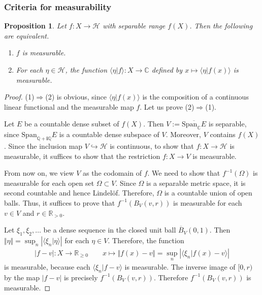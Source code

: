 \documentclass[12pt,b5paper,notitlepage]{article}
\theoremstyle{definition}
\theoremstyle{plain}
\newtheorem{pp}[df]{Proposition}
\newcommand{\ovl}{\overline}
\newcommand{\Span}{\mathrm{Span}}
\newcommand{\bk}[1]{\langle {#1}\rangle}
\newcommand{\im}{\mathbf{i}}
\newcommand{\Cbb}{\mathbb C}
\newcommand{\Qbb}{\mathbb Q}
\newcommand{\Rbb}{\mathbb R}
\newcommand{\MH}{\mathcal H}
\numberwithin{equation}{section}
\begin{document}
\begin{subappendices}
\subsubsection{Criteria for measurability}\label{lb529}







\begin{pp}\label{lb491}
Let $f:X\rightarrow \MH$ with separable range $f(X)$. Then the following are equivalent.
\begin{enumerate}
\item[(1)] $f$ is measurable. 
\item[(2)] For each $\eta\in \MH$, the function $\bk{\eta|f}:X\rightarrow\Cbb$ defined by $x\mapsto \bk{\eta|f(x)}$ is measurable.
\end{enumerate}
\end{pp}




\begin{proof}
(1)$\Rightarrow$(2) is obvious, since $\bk{\eta|f(x)}$ is the composition of a continuous linear functional and the measurable map $f$. Let us prove (2)$\Rightarrow$(1).

Let $E$ be a countable dense subset of $f(X)$. Then $V:=\ovl{\Span_\Cbb E}$ is separable, since $\Span_{\Qbb+\im\Qbb}E$ is a countable dense subspace of $V$. Moreover, $V$ contains $f(X)$. Since the inclusion map $V\hookrightarrow \MH$ is continuous, to show that $f:X\rightarrow \MH$ is measurable, it suffices to show that the restriction $f:X\rightarrow V$ is measurable.

From now on, we view $V$ as the codomain of $f$. We need to show that $f^{-1}(\Omega)$ is measurable for each open set $\Omega\subset V$. Since $\Omega$ is a separable metric space, it is second countable and hence Lindel\"of. Therefore, $\Omega$ is a countable union of open balls. Thus, it suffices to prove that $f^{-1}(B_V(v,r))$ is measurable for each $v\in V$ and $r\in\Rbb_{>0}$.

Let $\xi_1,\xi_2,\dots$ be a dense sequence in the closed unit ball $\ovl B_V(0,1)$. Then $\Vert\eta\Vert=\sup_n|\bk{\xi_n|\eta}|$ for each $\eta\in V$. Therefore, the function
\begin{align*}
|f-v|:X\rightarrow\Rbb_{\geq0}\qquad x\mapsto \Vert f(x)-v\Vert=\sup_n|\bk{\xi_n|f(x)-v}|
\end{align*}
is measurable, because each $\bk{\xi_n|f-v}$ is measurable. The inverse image of $[0,r)$ by the map $|f-v|$ is precisely $f^{-1}(B_V(v,r))$. Therefore $f^{-1}(B_V(v,r))$ is measurable.
\end{proof}


\end{subappendices}
\end{document}
